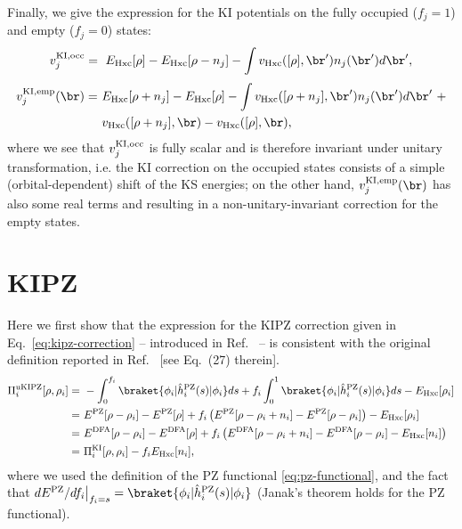 Finally, we give the expression for the KI potentials on the fully occupied ($f_j=1$) and empty ($f_j=0$) states:
%
\begin{equation}
    v^{\rm KI,occ}_j =\ E_{\rm Hxc}[\rho] - E_{\rm Hxc}[\rho-n_j] - \int v_{\rm Hxc}([\rho],\br') n_j(\br') d\br' ,
    \label{eq:ki-pot-occ}
\end{equation}
%
\begin{equation}
    \begin{split}
    v^{\rm KI,emp}_j(\br) =\ &E_{\rm Hxc}[\rho+n_j] - E_{\rm Hxc}[\rho] - \int v_{\rm Hxc}([\rho+n_j],\br') n_j(\br') d\br' \ + \\
    &v_{\rm Hxc}([\rho+n_j],\br) - v_{\rm Hxc}([\rho],\br) ,
    \end{split}
    \label{eq:ki-pot-emp}
\end{equation}
%
where we see that $v^{\rm KI,occ}_j$ is fully scalar and is therefore invariant under unitary transformation, i.e. the KI correction on the occupied states consists of a simple (orbital-dependent) shift of the KS energies; on the other hand, $v^{\rm KI,emp}_j(\br)$ has also some real terms and resulting in a non-unitary-invariant correction for the empty states.

\clearpage
\section*{KIPZ}
Here we first show that the expression for the KIPZ correction given in Eq.~\eqref{eq:kipz-correction} -- introduced in Ref.~\cite{nguyen_koopmans-compliant_2018} -- is consistent with the original definition reported in Ref.~\cite{borghi_koopmans-compliant_2014} [see Eq.~(27) therein].
%
\begin{equation}
    \begin{split}
    \Pi^{\rm uKIPZ}_i[\rho,\rho_i] =\ &- \int_{0}^{f_i} \braket{\phi_i|\hat{h}^{\rm PZ}_i(s)|\phi_i} ds + 
    f_i \int_{0}^{1} \braket{\phi_i|\hat{h}^{\rm PZ}_i(s)|\phi_i} ds - E_{\rm Hxc}[\rho_i] \\
    =\ &E^{\rm PZ}[\rho-\rho_i] - E^{\rm PZ}[\rho] + f_i \left( E^{\rm PZ}[\rho-\rho_i+n_i] - E^{\rm PZ}[\rho-\rho_i] \right) - E_{\rm Hxc}[\rho_i] \\
    =\ &E^{\rm DFA}[\rho-\rho_i] - E^{\rm DFA}[\rho] + f_i \left( E^{\rm DFA}[\rho-\rho_i+n_i] - E^{\rm DFA}[\rho-\rho_i] - E_{\rm Hxc}[n_i] \right) \\
    =\ &\Pi^{\text{KI}}_i[\rho,\rho_i] - f_i E_{\rm Hxc}[n_i] ,
    \end{split}
    \label{eq:kipz-borghi}
\end{equation}
%
where we used the definition of the PZ functional \eqref{eq:pz-functional}, and the fact that $dE^{\rm PZ} / df_i \big|_{f_i=s} = \braket{\phi_i|\hat{h}^{\rm PZ}_i(s)|\phi_i}$ (Janak's theorem holds for the PZ functional).

